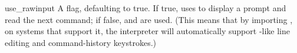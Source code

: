\begin{memberdesc}{use_rawinput}
A flag, defaulting to true.  If true,  uses
 to display a prompt and read the next command;
if false,  and
 are used. (This means that by
importing , on systems that support it, the
interpreter will automatically support -like line editing 
and command-history keystrokes.)
\end{memberdesc}
